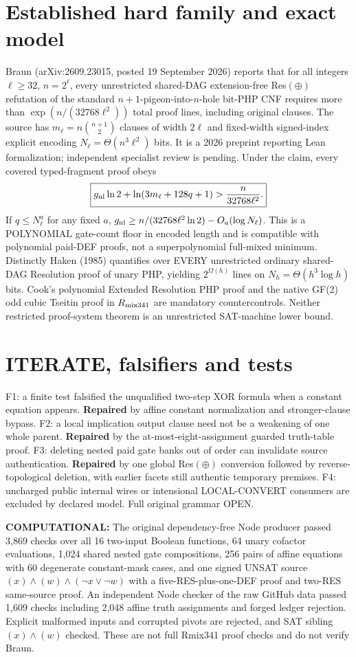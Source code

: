 \documentclass[11pt]{article}
\begin{document}
\section*{Established hard family and exact model}
Braun (arXiv:2609.23015, posted 19 September 2026) reports that for all integers $\ell\ge32$, $n=2^\ell$, every unrestricted shared-DAG extension-free Res$(\oplus)$ refutation of the standard $n+1$-pigeon-into-$n$-hole bit-PHP CNF requires more than $\exp(n/(32768\ell^2))$ total proof lines, including original clauses. The source has $m_\ell=n\binom{n+1}{2}$ clauses of width $2\ell$ and fixed-width signed-index explicit encoding $N_\ell=\Theta(n^3\ell^2)$ bits. It is a 2026 preprint reporting Lean formalization; independent specialist review is pending. Under the claim, every covered typed-fragment proof obeys
\[
\boxed{g_{\rm nl}\ln2+\ln(3m_\ell+128q+1)>\frac{n}{32768\ell^2}.}
\]
If $q\le N_\ell^a$ for any fixed $a$, $g_{\rm nl}\ge n/(32768\ell^2\ln2)-O_a(\log N_\ell)$. This is a POLYNOMIAL gate-count floor in encoded length and is compatible with polynomial paid-DEF proofs, not a superpolynomial full-mixed minimum. Distinctly Haken (1985) quantifies over EVERY unrestricted ordinary shared-DAG Resolution proof of unary PHP, yielding $2^{\Omega(h)}$ lines on $N_h=\Theta(h^3\log h)$ bits. Cook's polynomial Extended Resolution PHP proof and the native GF(2) odd cubic Tseitin proof in $R_{\rm mix341}$ are mandatory countercontrols. Neither restricted proof-system theorem is an unrestricted SAT-machine lower bound.

\section*{ITERATE, falsifiers and tests}
F1: a finite test falsified the unqualified two-step XOR formula when a constant equation appears. \textbf{Repaired} by affine constant normalization and stronger-clause bypass. F2: a local implication output clause need not be a weakening of one whole parent. \textbf{Repaired} by the at-most-eight-assignment guarded truth-table proof. F3: deleting nested paid gate banks out of order can invalidate source authentication. \textbf{Repaired} by one global Res$(\oplus)$ conversion followed by reverse-topological deletion, with earlier facets still authentic temporary premises. F4: uncharged public internal wires or intensional LOCAL-CONVERT consumers are excluded by declared model. Full original grammar OPEN.

\textbf{COMPUTATIONAL:} The original dependency-free Node producer passed 3,869 checks over all 16 two-input Boolean functions, 64 unary cofactor evaluations, 1,024 shared nested gate compositions, 256 pairs of affine equations with 60 degenerate constant-mask cases, and one signed UNSAT source $(x)\wedge(w)\wedge(\neg x\lor\neg w)$ with a five-RES-plus-one-DEF proof and two-RES same-source proof. An independent Node checker of the raw GitHub data passed 1,609 checks including 2,048 affine truth assignments and forged ledger rejection. Explicit malformed inputs and corrupted pivots are rejected, and SAT sibling $(x)\wedge(w)$ checked. These are not full Rmix341 proof checks and do not verify Braun.
\end{document}
